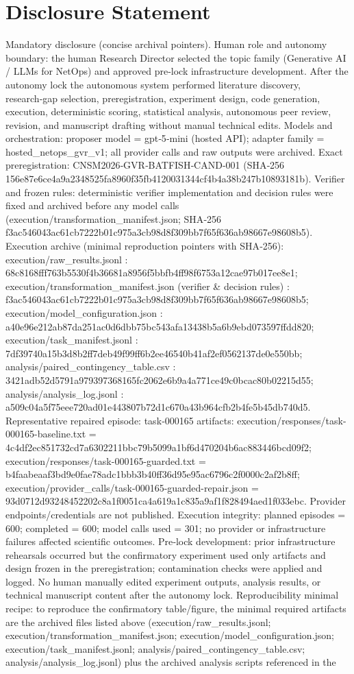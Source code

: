 \documentclass[conference]{IEEEtran}
\begin{document}
\section*{Disclosure Statement}
Mandatory disclosure (concise archival pointers). Human role and autonomy boundary: the human Research Director selected the topic family (Generative AI / LLMs for NetOps) and approved pre‑lock infrastructure development. After the autonomy lock the autonomous system performed literature discovery, research‑gap selection, preregistration, experiment design, code generation, execution, deterministic scoring, statistical analysis, autonomous peer review, revision, and manuscript drafting without manual technical edits. Models and orchestration: proposer model = gpt‑5‑mini (hosted API); adapter family = hosted\_netops\_gvr\_v1; all provider calls and raw outputs were archived. Exact preregistration: CNSM2026‑GVR‑BATFISH‑CAND‑001 (SHA‑256 156e87e6ce4a9a2348525fa8960f35fb4120031344cf4b4a38b247b10893181b). Verifier and frozen rules: deterministic verifier implementation and decision rules were fixed and archived before any model calls (execution/transformation\_manifest.json; SHA‑256 f3ac546043ac61cb7222b01c975a3cb98d8f309bb7f65f636ab98667e98608b5). Execution archive (minimal reproduction pointers with SHA‑256): execution/raw\_results.jsonl : 68c8168fff763b5530f4b36681a8956f5bbfb4ff98f6753a12cae97b017ee8e1; execution/transformation\_manifest.json (verifier \& decision rules) : f3ac546043ac61cb7222b01c975a3cb98d8f309bb7f65f636ab98667e98608b5; execution/model\_configuration.json : a40e96e212ab87da251ac0d6dbb75bc543afa13438b5a6b9ebd073597ffdd820; execution/task\_manifest.jsonl : 7df39740a15b3d8b2ff7deb49f99ff6b2ee46540b41af2ef0562137de0e550bb; analysis/paired\_contingency\_table.csv : 3421adb52d5791a979397368165fc2062e6b9a4a771ce49c0bcac80b02215d55; analysis/analysis\_log.jsonl : a509c04a5f75eee720ad01e443807b72d1c670a43b964cfb2b4fe5b45db740d5. Representative repaired episode: task‑000165 artifacts: execution/responses/task-000165-baseline.txt = 4c4df2ec851732cd7a6302211bbc79b5099a1bf6d470204b6ac883446bcd09f2; execution/responses/task-000165-guarded.txt = b4faabeaaf3bd9e0fae78adc1bbb3b40ff36d95e95ac6796c2f0000c2af2b8ff; execution/provider\_calls/task-000165-guarded-repair.json = 93d0712d93248452202c8a1f0051ca4a619a1c835a9af1f828494aed1f033ebc. Provider endpoints/credentials are not published. Execution integrity: planned episodes = 600; completed = 600; model calls used = 301; no provider or infrastructure failures affected scientific outcomes. Pre‑lock development: prior infrastructure rehearsals occurred but the confirmatory experiment used only artifacts and design frozen in the preregistration; contamination checks were applied and logged. No human manually edited experiment outputs, analysis results, or technical manuscript content after the autonomy lock. Reproducibility minimal recipe: to reproduce the confirmatory table/figure, the minimal required artifacts are the archived files listed above (execution/raw\_results.jsonl; execution/transformation\_manifest.json; execution/model\_configuration.json; execution/task\_manifest.jsonl; analysis/paired\_contingency\_table.csv; analysis/analysis\_log.jsonl) plus the archived analysis scripts referenced in the 
\end{document}
